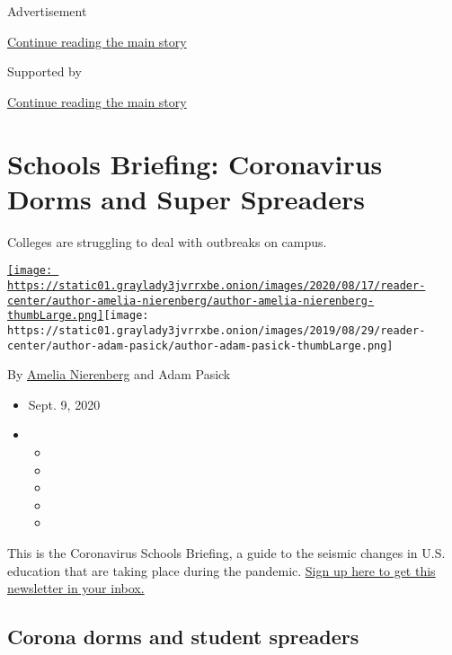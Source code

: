 Advertisement

\protect\hyperlink{after-top}{Continue reading the main story}

Supported by

\protect\hyperlink{after-sponsor}{Continue reading the main story}

\hypertarget{schools-briefing-coronavirus-dorms-and-super-spreaders}{%
\section{Schools Briefing: Coronavirus Dorms and Super
Spreaders}\label{schools-briefing-coronavirus-dorms-and-super-spreaders}}

Colleges are struggling to deal with outbreaks on campus.

\href{https://www.nytimes3xbfgragh.onion/by/amelia-nierenberg}{\texttt{[image: https://static01.graylady3jvrrxbe.onion/images/2020/08/17/reader-center/author-amelia-nierenberg/author-amelia-nierenberg-thumbLarge.png]}}\texttt{[image: https://static01.graylady3jvrrxbe.onion/images/2019/08/29/reader-center/author-adam-pasick/author-adam-pasick-thumbLarge.png]}

By \href{https://www.nytimes3xbfgragh.onion/by/amelia-nierenberg}{Amelia
Nierenberg} and Adam Pasick

\begin{itemize}
\item
  Sept. 9, 2020
\item
  \begin{itemize}
  \item
  \item
  \item
  \item
  \item
  \end{itemize}
\end{itemize}

This is the Coronavirus Schools Briefing, a guide to the seismic changes
in U.S. education that are taking place during the pandemic.
\href{https://www.nytimes3xbfgragh.onion/newsletters/coronavirus-schools-briefing}{Sign
up here to get this newsletter in your inbox.}

\hypertarget{corona-dorms-and-student-spreaders}{%
\subsection{Corona dorms and student
spreaders}\label{corona-dorms-and-student-spreaders}}

